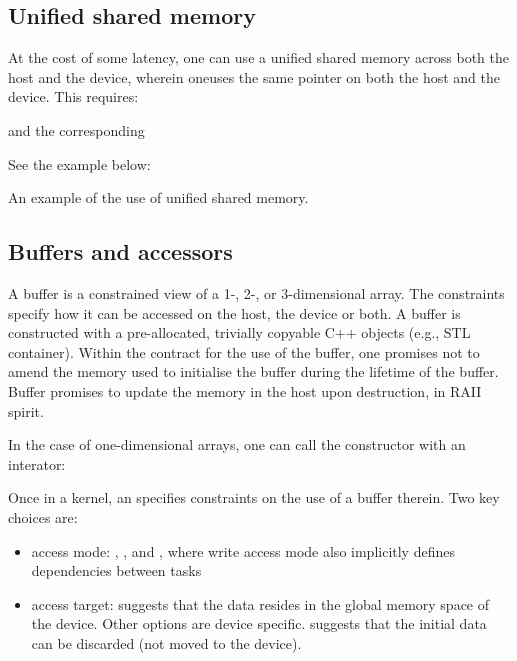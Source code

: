 \subsection{Unified shared memory}
 
At the cost of some latency, one can use a unified shared memory across both the host and the device, wherein oneuses the same pointer on both the host and the device. This requires:
 

and the corresponding 


See the example below:
\raggedbottom
\begin{codebox}[]{\href{https://godbolt.org/z/hc1f9Pnj5}{\ExternalLink}}
\footnotesize An example of the use of unified shared memory.
\tcblower
{}
\end{codebox}
 
\subsection{Buffers and accessors}

A buffer is a constrained view of a 1-, 2-, or 3-dimensional array.
The constraints specify how it can be accessed on the host, the device or both. 
A buffer is constructed with a pre-allocated, trivially copyable C++ objects (e.g., STL container). 
Within the contract for the use of the buffer, 
one promises not to amend the memory used to initialise the buffer during the lifetime of the buffer. 
Buffer promises to update the memory in the host upon destruction, in RAII spirit. 

In the case of one-dimensional arrays, one can call the constructor with an interator:

Once in a kernel, an  specifies constraints on the use of a buffer therein. 
Two key choices are:
\begin{itemize}
\item access mode: , , and , where write access mode also implicitly defines dependencies between tasks
\item access target:  suggests that the data resides in the global memory space of the device. Other options are device specific.  suggests that the initial data can be discarded (not moved to the device). 
\end{itemize}

